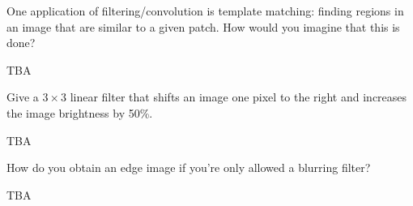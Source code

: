 
\begin{blocksection}
\question One application of filtering/convolution is template matching: finding regions in an image that are similar to a given patch. How would you imagine that this is done?

\begin{solution}[0.75in]
{\color{red} TBA}
\end{solution}
\end{blocksection}


\begin{blocksection}
\question Give a $3 \times 3$ linear filter that shifts an image one pixel to the right and increases the image brightness by 50\%.

\begin{solution}[0.75in]
{\color{red} TBA}
\end{solution}
\end{blocksection}


\begin{blocksection}
\question How do you obtain an edge image if you're only allowed a blurring filter?

\begin{solution}[0.75in]
{\color{red} TBA}
\end{solution}
\end{blocksection}

